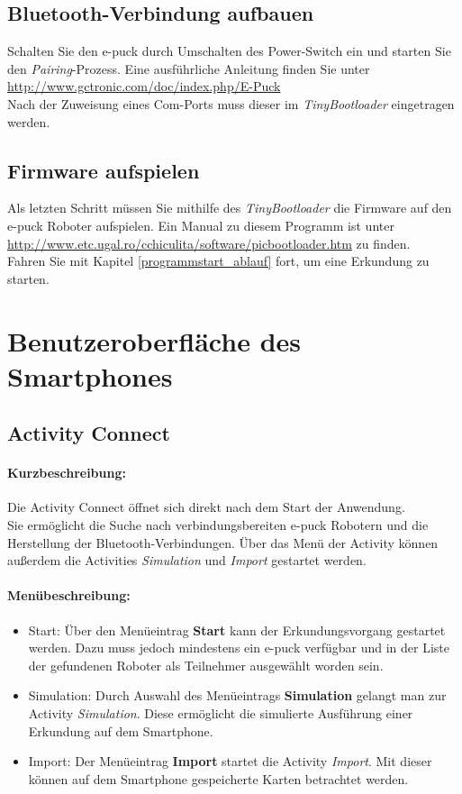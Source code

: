 \documentclass[10pt,a4paper]{article}
\let\oldsection\section
\renewcommand{\section}{\newpage \oldsection}
\begin{document}
			\subsection{Bluetooth-Verbindung aufbauen} 
				Schalten Sie den e-puck durch Umschalten des Power-Switch ein und starten Sie den \textit{Pairing}-Prozess. Eine ausf\"uhrliche Anleitung finden Sie
				unter  \url{http://www.gctronic.com/doc/index.php/E-Puck} \\
				Nach der Zuweisung eines Com-Ports muss dieser im \textit{TinyBootloader} eingetragen werden.			
			\subsection{Firmware aufspielen} 
				Als letzten Schritt m\"ussen Sie mithilfe des \textit{TinyBootloader} die Firmware auf den e-puck Roboter aufspielen. Ein Manual zu diesem Programm
				ist unter \url{http://www.etc.ugal.ro/cchiculita/software/picbootloader.htm} zu finden. \\
				Fahren Sie mit Kapitel \ref{programmstart_ablauf} fort, um eine Erkundung zu starten.
\section{Benutzeroberfl\"ache des Smartphones}
\label{benutzeroberflaeche}
	\subsection{Activity Connect}
		\paragraph*{Kurzbeschreibung:}
		Die Activity Connect \"offnet sich direkt nach dem Start der Anwendung. \\	
		Sie ermöglicht die Suche nach verbindungsbereiten e-puck Robotern und die Herstellung der Bluetooth-Verbindungen.
		Über das Men\"u der Activity können außerdem die Activities \textit{Simulation} und \textit{Import} gestartet werden.

		\paragraph*{Menübeschreibung:}
		\begin{itemize}
			\item Start: Über den Men\"ueintrag \textbf{Start} kann der Erkundungsvorgang gestartet werden. Dazu muss jedoch mindestens ein e-puck
			verf\"ugbar und in der Liste der gefundenen Roboter als Teilnehmer ausgew\"ahlt worden sein.
			\item Simulation: Durch Auswahl des Men\"ueintrags \textbf{Simulation} gelangt man zur Activity \textit{Simulation}. Diese erm\"oglicht
			die simulierte Ausf\"uhrung einer Erkundung auf dem Smartphone.
			\item Import: Der Men\"ueintrag \textbf{Import} startet die Activity \textit{Import}. Mit dieser k\"onnen auf dem Smartphone gespeicherte
			Karten betrachtet werden.
		\end{itemize}
\end{document}
